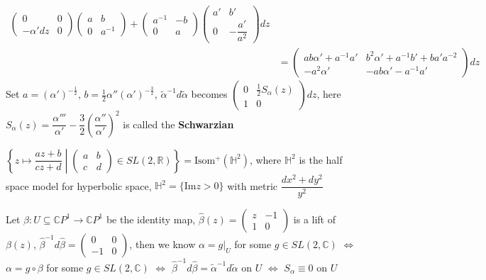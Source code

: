 \documentclass[../main.tex]{subfiles}
\begin{document}
\begin{example}
\begin{align*}
\begin{pmatrix}
0 &0  \\
-\alpha'dz &0
\end{pmatrix}
\begin{pmatrix}
a &b  \\
 0&a^{-1}
\end{pmatrix}
+\begin{pmatrix}
a^{-1} &-b  \\
0 & a
\end{pmatrix}\begin{pmatrix}
a' &b'  \\
0 &-\dfrac{a'}{a^2}
\end{pmatrix}dz \\
&=\begin{pmatrix}
ab\alpha'+a^{-1}a' &b^2\alpha'+a^{-1}b'+ba'a^{-2}  \\
-a^2\alpha' &-ab\alpha'-a^{-1}a'
\end{pmatrix}dz
\end{align*}
Set $a=(\alpha')^{-\frac{1}{2}}$, $b=\frac{1}{2}\alpha''(\alpha')^{-\frac{3}{2}}$, $\widetilde\alpha^{-1}d\widetilde\alpha$ becomes $\begin{pmatrix}
0 & \frac{1}{2}S_{\alpha}(z) \\
1 & 0
\end{pmatrix}dz$, here $S_\alpha(z)=\dfrac{\alpha'''}{\alpha'}-\dfrac{3}{2}\left(\dfrac{\alpha''}{\alpha'}\right)^2$ is called the \textbf{Schwarzian}
\end{example}

\begin{remark}
$\left\{z\mapsto\dfrac{az+b}{cz+d}\middle|\begin{pmatrix}
a &b \\
c&d
\end{pmatrix}\in SL(2,\mathbb R)\right\}=\mathrm{Isom^+}(\mathbb H^2)$, where $\mathbb H^2$ is the half space model for hyperbolic space, $\mathbb H^2=\{\mathrm{Im}z>0\}$ with metric $\dfrac{dx^2+dy^2}{y^2}$
\end{remark}

\begin{example}
Let $\beta:U\subseteq\mathbb CP^1\to\mathbb CP^1$ be the identity map, $\widehat\beta(z)=\begin{pmatrix}
z &-1 \\
1 &0
\end{pmatrix}$ is a lift of $\beta(z)$, $\widehat\beta^{-1}d\widehat\beta=\begin{pmatrix}
0&0\\
-1&0
\end{pmatrix}$, then we know $\alpha=g|_U$ for some $g\in SL(2,\mathbb C)$ $\Leftrightarrow$ $\alpha=g\circ\beta$ for some $g\in SL(2,\mathbb C)$ $\Leftrightarrow$ $\widehat\beta^{-1}d\widehat\beta=\widetilde\alpha^{-1}d\widetilde\alpha$ on $U$ $\Leftrightarrow$ $S_\alpha\equiv0$ on $U$
\end{example}
\end{document}
